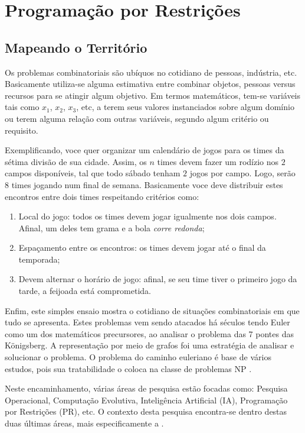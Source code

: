 \chapter{Programação por Restrições}\label{cp:pr}



\section{Mapeando o Territ\'orio}


Os problemas combinatoriais são ubíquos no cotidiano de pessoas, indústria, etc.
Basicamente utiliza-se alguma estimativa entre combinar objetos,
pessoas versus recursos para se atingir algum objetivo.
Em termos matemáticos, tem-se variáveis tais como $x_1$, $x_2$, $x_3$, etc, a terem
seus valores instanciados sobre algum domínio ou terem alguma relação
com outras variáveis, segundo algum critério ou requisito.

Exemplificando, voce quer organizar um calendário de jogos para os times da
sétima divisão de sua cidade. Assim, os $n$ times devem fazer um rodízio
nos $2$ campos disponíveis, tal que todo sábado  tenham $2$ jogos
por campo. Logo, serão $8$ times jogando num final de semana. Basicamente
voce deve distribuir estes encontros entre dois times respeitando critérios
como:
\begin{enumerate}
\item Local do jogo: todos os times devem jogar igualmente nos dois campos.
Afinal, um deles tem grama e a bola \textit{corre redonda};
\item Espaçamento entre os encontros: os times devem jogar até o final
da temporada;
\item Devem alternar o horário de jogo: afinal, se seu time tiver o primeiro
jogo da tarde, a feijoada está comprometida.
\end{enumerate}

Enfim, este simples ensaio mostra o cotidiano de situações combinatoriais
em que tudo se apresenta. Estes problemas vem sendo atacados há séculos tendo 
Euler como um dos matemáticos precursores, ao analisar o problema das 7 pontes 
das  Königsberg. A representação por meio de grafos foi uma estratégia
de analisar e solucionar o problema. O problema do caminho euleriano é
 base de vários estudos, pois sua  tratabilidade o coloca na classe
 de problemas NP \cite{sipser12}.

Neste encaminhamento, várias áreas de pesquisa  estão focadas como: Pesquisa
Operacional, Computação Evolutiva, Inteligência Artificial (IA), Programação por
Restrições (PR), etc. O contexto desta pesquisa encontra-se dentro destas duas 
últimas áreas, mais especificamente a \PR .


